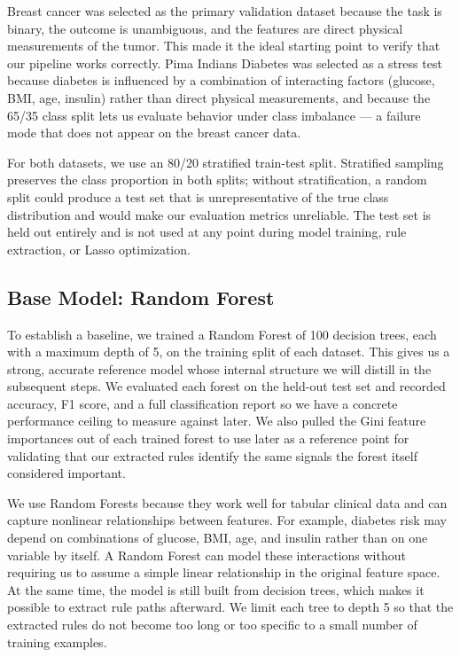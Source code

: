 \documentclass[11pt]{article}
\begin{document}
Breast cancer was selected as the primary validation dataset because the task is binary, the outcome is unambiguous, and the features are direct physical measurements of the tumor. This made it the ideal starting point to verify that our pipeline works correctly. Pima Indians Diabetes was selected as a stress test because diabetes is influenced by a combination of interacting factors (glucose, BMI, age, insulin) rather than direct physical measurements, and because the 65/35 class split lets us evaluate behavior under class imbalance --- a failure mode that does not appear on the breast cancer data.

For both datasets, we use an 80/20 stratified train-test split. Stratified sampling preserves the class proportion in both splits; without stratification, a random split could produce a test set that is unrepresentative of the true class distribution and would make our evaluation metrics unreliable. The test set is held out entirely and is not used at any point during model training, rule extraction, or Lasso optimization.

\subsection{Base Model: Random Forest}

To establish a baseline, we trained a Random Forest of 100 decision trees, each with a maximum depth of 5, on the training split of each dataset. This gives us a strong, accurate reference model whose internal structure we will distill in the subsequent steps. We evaluated each forest on the held-out test set and recorded accuracy, F1 score, and a full classification report so we have a concrete performance ceiling to measure against later. We also pulled the Gini feature importances out of each trained forest to use later as a reference point for validating that our extracted rules identify the same signals the forest itself considered important.

We use Random Forests because they work well for tabular clinical data and can capture nonlinear relationships between features. For example, diabetes risk may depend on combinations of glucose, BMI, age, and insulin rather than on one variable by itself. A Random Forest can model these interactions without requiring us to assume a simple linear relationship in the original feature space. At the same time, the model is still built from decision trees, which makes it possible to extract rule paths afterward. We limit each tree to depth 5 so that the extracted rules do not become too long or too specific to a small number of training examples.
\end{document}
